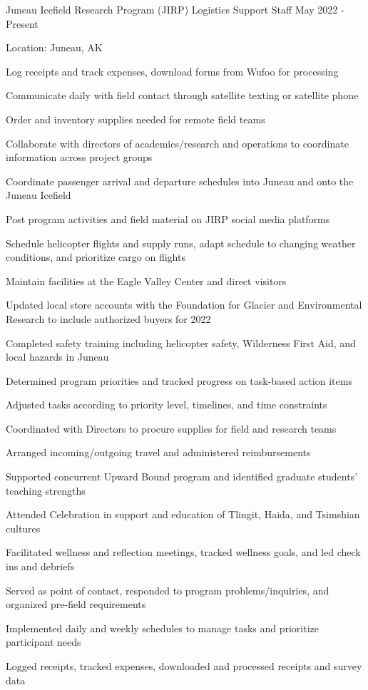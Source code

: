 \documentclass{../styles/cv}
\begin{document}
\subsectionpositiondate
    {Juneau Icefield Research Program (JIRP)}
    {Logistics Support Staff}
    {May 2022 - Present}
\resumesublistbegin
    \item Location: Juneau, AK
    \item Log receipts and track expenses, download forms from Wufoo for processing
    \item Communicate daily with field contact through satellite texting or satellite phone
    \item Order and inventory supplies needed for remote field teams
    \item Collaborate with directors of academics/research and operations to coordinate information across project groups
    \item Coordinate passenger arrival and departure schedules into Juneau and onto the Juneau Icefield
    \item Post program activities and field material on JIRP social media platforms
    \item Schedule helicopter flights and supply runs, adapt schedule to changing weather conditions, and prioritize cargo on flights
    \item Maintain facilities at the Eagle Valley Center and direct visitors
    \item Updated local store accounts with the Foundation for Glacier and Environmental Research to include authorized buyers for 2022
    \item Completed safety training including helicopter safety, Wilderness First Aid, and local hazards in Juneau
    \item Determined program priorities and tracked progress on task-based action items
    \item Adjusted tasks according to priority level, timelines, and time constraints
    \item Coordinated with Directors to procure supplies for field and research teams
    \item Arranged incoming/outgoing travel and administered reimbursements
    \item Supported concurrent Upward Bound program and identified graduate students' teaching strengths
    \item Attended Celebration in support and education of Tlingit, Haida, and Tsimshian cultures
    \item Facilitated wellness and reflection meetings, tracked wellness goals, and led check ins and debriefs
    \item Served as point of contact, responded to program problems/inquiries, and organized pre-field requirements
    \item Implemented daily and weekly schedules to manage tasks and prioritize participant needs
    \item Logged receipts, tracked expenses, downloaded and processed receipts and survey data
\resumesublistend
\end{document}
